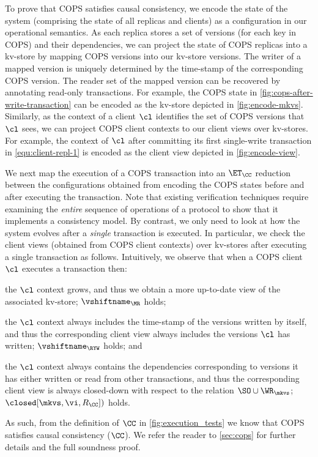 

To prove that COPS satisfies causal consistency,
we encode the state of the system 
(comprising the state of all replicas and clients) as a
configuration in  our operational semantics. 
As each replica stores a set of versions (for each key in COPS) and their dependencies, 
we can project the state of  COPS replicas into a kv-store 
by mapping  COPS versions into our kv-store versions.
The writer of a mapped version is uniquely
determined by the time-stamp of the corresponding COPS version.
The reader set of the mapped version 
can be recovered by annotating read-only transactions.
For example, the COPS state in \cref{fig:cops-after-write-transaction} can be encoded as the kv-store depicted in \cref{fig:encode-mkvs}.
Similarly, as the context of a client $\cl$ identifies the set of COPS versions that $\cl$ sees, 
we can project COPS client contexts to our client views over kv-stores. 
For example, the context of \( \cl \) after committing its first single-write transaction in \eqref{equ:client-repl-1} is encoded as the client view depicted in \cref{fig:encode-view}.

We next map the execution of a COPS transaction into an $\ET_{\CC}$ reduction between the configurations 
obtained from encoding the COPS states before and after executing the transaction.
Note that existing verification techniques \cite{framework-concur,seebelieve} require examining the \emph{entire} sequence of operations of a protocol to show that it implements a consistency model.
By contrast, we only need to look at how the system evolves after a \emph{single} transaction is executed.
In particular, we check the client views (obtained from COPS client contexts) over kv-stores after executing a single transaction as follows.
Intuitively, we observe that when a COPS client $\cl$ executes a transaction then:
\begin{enumerate*} 
\item the $\cl$ context grows, and thus we obtain a more up-to-date view of the associated kv-store; \ie $\vshiftname_{\MR}$ holds;
\item the $\cl$ context always includes the time-stamp of the versions written by itself, and thus the 
corresponding client view always includes the versions $\cl$ has written; \ie $\vshiftname_{\RYW}$ holds; and
\item the $\cl$ context always contains the dependencies corresponding to versions it has 
either written or read from other transactions, and thus the corresponding client view is always closed-down 
with respect to the relation $\SO \cup \WR_{\mkvs}$; \ie $\closed[\mkvs, \vi, R_{\CC}])$ holds.
\end{enumerate*}
As such, from the definition of $\CC$ in \cref{fig:execution_tests} we know that COPS satisfies causal consistency ($\CC$).
We refer the reader to  \cref{sec:cops} for further details and the full soundness proof.

